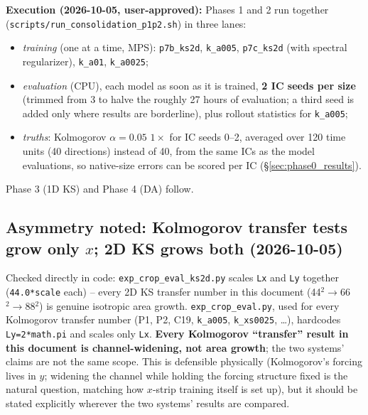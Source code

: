 \documentclass[11pt]{article}
\begin{document}
\textbf{Execution (2026-10-05, user-approved):} Phases 1 and 2 run
together (\texttt{scripts/run\_consolidation\_p1p2.sh}) in three lanes:
\begin{itemize}[leftmargin=*]
\item \emph{training} (one at a time, MPS): \texttt{p7b\_ks2d},
  \texttt{k\_a005}, \texttt{p7c\_ks2d} (with spectral regularizer),
  \texttt{k\_a01}, \texttt{k\_a0025};
\item \emph{evaluation} (CPU), each model as soon as it is trained,
  \textbf{2 IC seeds per size} (trimmed from 3 to halve the roughly
  27 hours of evaluation; a third seed is added only where results are
  borderline), plus rollout statistics for \texttt{k\_a005};
\item \emph{truths}: Kolmogorov $\alpha{=}0.05$ $1\times$ for IC seeds 0--2,
  averaged over 120 time units (40 directions) instead of 40, from the
  same ICs as the model evaluations, so native-size errors can be scored
  per IC (\S\ref{sec:phase0_results}).
\end{itemize}
Phase 3 (1D KS) and Phase 4 (DA) follow.

\subsection{Asymmetry noted: Kolmogorov transfer tests grow only
$x$; 2D KS grows both (2026-10-05)}
\label{sec:xy_growth_asymmetry}

Checked directly in code: \texttt{exp\_crop\_eval\_ks2d.py} scales
\texttt{Lx} and \texttt{Ly} together (\texttt{44.0*scale} each) --
every 2D KS transfer number in this document (44$^2\to$66$^2\to$88$^2$)
is genuine isotropic area growth. \texttt{exp\_crop\_eval.py}, used for
every Kolmogorov transfer number (P1, P2, C19, \texttt{k\_a005},
\texttt{k\_xs0025}, \ldots), hardcodes \texttt{Ly=2*math.pi} and scales
only \texttt{Lx}. \textbf{Every Kolmogorov ``transfer'' result in this
document is channel-widening, not area growth}; the two systems' claims
are not the same scope. This is defensible physically (Kolmogorov's
forcing lives in $y$; widening the channel while holding the forcing
structure fixed is the natural question, matching how $x$-strip
training itself is set up), but it should be stated explicitly
wherever the two systems' results are compared.
\end{document}
